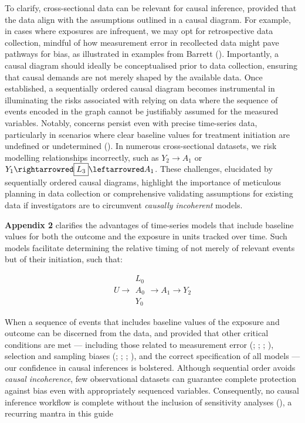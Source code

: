 \documentclass[
  singlecolumn]{article}
\begin{document}
To clarify, cross-sectional data can be relevant for causal inference,
provided that the data align with the assumptions outlined in a causal
diagram. For example, in cases where exposures are infrequent, we may
opt for retrospective data collection, mindful of how measurement error
in recollected data might pave pathways for bias, as illustrated in
examples from Barrett (). Importantly, a
causal diagram should ideally be conceptualised prior to data
collection, ensuring that causal demands are not merely shaped by the
available data. Once established, a sequentially ordered causal diagram
becomes instrumental in illuminating the risks associated with relying
on data where the sequence of events encoded in the graph cannot be
justifiably assumed for the measured variables. Notably, concerns
persist even with precise time-series data, particularly in scenarios
where clear baseline values for treatment initiation are undefined or
undetermined ().
In numerous cross-sectional datasets, we risk modelling relationships
incorrectly, such as \(Y_2 \to A_1\) or
\(Y_1 \rightarrowred \boxed{L_3} \leftarrowred A_1\). These challenges,
elucidated by sequentially ordered causal diagrams, highlight the
importance of meticulous planning in data collection or comprehensive
validating assumptions for existing data if investigators are to
circumvent \emph{causally incoherent} models.

\textbf{Appendix 2} clarifies the advantages of time-series models that
include baseline values for both the outcome and the exposure in units
tracked over time. Such models facilitate determining the relative
timing of not merely of relevant events but of their initiation, such
that:

\[
U \to
\boxed{
\begin{aligned}
L_{0} \\
A_{0} \\
Y_{0}
\end{aligned}
}
\to A_{1} \to Y_{2}
\]

When a sequence of events that includes baseline values of the exposure
and outcome can be discerned from the data, and provided that other
critical conditions are met --- including those related to measurement
error (;
;
;
),
selection and sampling biases (; ;
;
), and the correct
specification of all models --- our confidence in causal inferences is
bolstered. Although sequential order avoids \emph{causal incoherence},
few observational datasets can guarantee complete protection against
bias even with appropriately sequenced variables. Consequently, no
causal inference workflow is complete without the inclusion of
sensitivity analyses (), a recurring mantra in this guide
\end{document}
